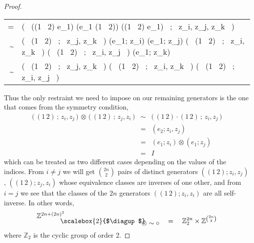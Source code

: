 \documentclass{amsbook} %
\newcommand{\bigquotient}[2]{ \raisebox{0.75\height}{$#1$} \mkern-12mu\scalebox{2}{$\diagup$}\mkern-10mu \raisebox{-0.5\height}{$#2$} }
\numberwithin{section}{chapter}
\begin{document}
\begin{proof}
\begin{longtable}{RL}
			= & \big( \, ((1 \, 2) \otimes e_1) \cdot (e_1 \otimes (1 \, 2)) \cdot ((1 \, 2) \otimes e_1) \, ; \, z_i, z_j, z_k \, \big) \\
			\sim & \big( \, (1 \, 2) \, ; \, z_j, z_k \, \big) \otimes (e_1; z_i) \otimes (e_1; z_j) \otimes \big( \, (1 \, 2) \, ; \, z_i, z_k \, \big) \otimes \big( \, (1 \, 2) \, ; \, z_i, z_j \, \big) \otimes (e_1; z_k) \\
			\sim & \big( \, (1 \, 2) \, ; \, z_j, z_k \, \big) \otimes \big( \, (1 \, 2) \, ; \, z_i, z_k \, \big) \otimes \big( \, (1 \, 2) \, ; \, z_i, z_j \, \big)
\end{longtable}
Thus the only restraint we need to impose on our remaining generators is the one that comes from the symmetry condition,
\[ \begin{array}{rll}
			\big( \, (1 \, 2) \, ; \, z_i, z_j \, \big) \, \otimes \, \big( \, (1 \, 2) \, ; \, z_j, z_i \, \big) & \sim & \big( \, (1 \, 2) \cdot (1 \, 2) \, ; \, z_i, z_j \, \big) \\
			& = & (e_2; z_i, z_j) \\
			& = & (e_1; z_i) \otimes (e_1; z_j) \\
			& = & I
		\end{array}
\]
which can be treated as two different cases depending on the values of the indices. From $i \neq j$ we will get ${2n}\choose{2}$ pairs of distinct generators $((1 \, 2);z_i, z_j)$, $((1 \, 2);z_j, z_i)$ whose equivalence classes are inverses of one other, and from $i = j$ we see that the classes of the $2n$ generators $((1 \, 2);z_i, z_i)$ are all self-inverse. In other words,
\[ \bigquotient{\mathbb{Z}^{2n + (2n)^2}}{\otimes \sim \circ} \quad = \quad \mathbb{Z}_2^{2n} \times \mathbb{Z}^{{2n}\choose{2}} \]
where $\mathbb{Z}_2$ is the cyclic group of order 2.


\end{proof}
\end{document}

